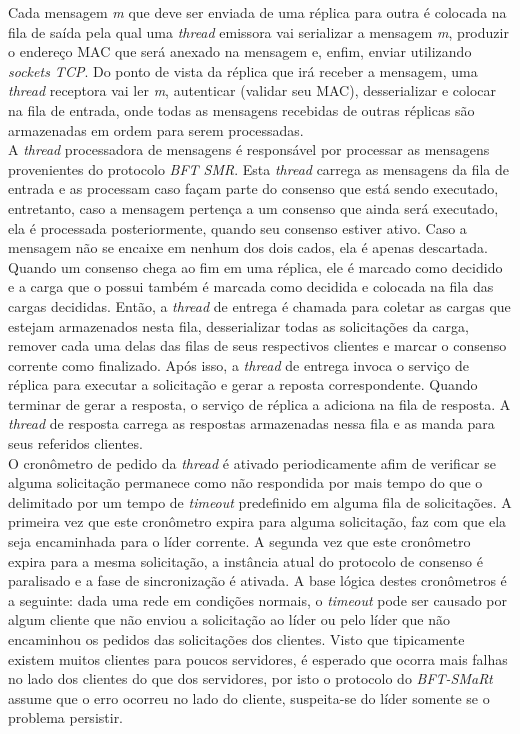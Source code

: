 	Cada mensagem \textit{m} que deve ser enviada de uma réplica para outra é colocada na fila de saída pela qual uma \textit{thread} emissora vai serializar a mensagem \textit{m}, produzir o endereço MAC que será anexado na mensagem e, enfim, enviar utilizando \textit{sockets TCP}. Do ponto de vista da réplica que irá receber a mensagem, uma \textit{thread} receptora vai ler \textit{m}, autenticar (validar seu MAC), desserializar e colocar na fila de entrada, onde todas as mensagens recebidas de outras réplicas são armazenadas em ordem para serem processadas.  \\
	
	A \textit{thread} processadora de mensagens é responsável por processar as mensagens provenientes do protocolo \textit{BFT SMR}. Esta \textit{thread} carrega as mensagens da fila de entrada e as processam caso façam parte do consenso que está sendo executado, entretanto, caso a mensagem pertença a um consenso que ainda será executado, ela é processada posteriormente, quando seu consenso estiver ativo. Caso a mensagem não se encaixe em nenhum dos dois cados, ela é apenas descartada. \\
	
	 Quando um consenso chega ao fim em uma réplica, ele é marcado como decidido e a carga que o possui também é marcada como decidida e colocada na fila das cargas decididas. Então, a \textit{thread} de entrega é chamada para coletar as cargas que estejam armazenados nesta fila, desserializar todas as solicitações da carga, remover cada uma delas das filas de seus respectivos clientes e marcar o  consenso corrente como finalizado. Após isso, a \textit{thread} de entrega invoca o serviço de réplica  para executar a solicitação e gerar a reposta correspondente. Quando terminar de gerar a resposta, o serviço de réplica a adiciona na fila de resposta. A \textit{thread} de resposta carrega as respostas armazenadas nessa fila e as manda para seus referidos clientes. \\
	 
	 O cronômetro de pedido da \textit{thread} é ativado periodicamente afim de verificar se alguma solicitação permanece como não respondida por mais tempo do que o delimitado por um tempo de \textit{timeout} predefinido em alguma fila de solicitações. A primeira vez que este cronômetro expira para alguma solicitação, faz com que ela seja encaminhada para o líder corrente. A segunda vez que este cronômetro expira para a mesma solicitação, a instância atual do protocolo de consenso é paralisado e a fase de sincronização é ativada. A base lógica destes cronômetros é a seguinte: dada uma rede em condições normais, o \textit{timeout} pode ser causado por algum cliente que não enviou a solicitação ao líder ou pelo líder que não encaminhou os pedidos das solicitações dos clientes. Visto que tipicamente existem muitos clientes para poucos servidores, é esperado que ocorra mais falhas no lado dos clientes do que dos servidores, por isto o protocolo do \textit{BFT-SMaRt} assume que o erro ocorreu no lado do cliente, suspeita-se do líder somente se o problema persistir. \\
	 
